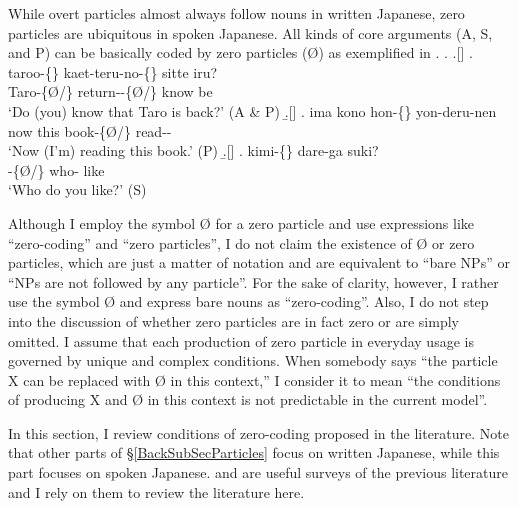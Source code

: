 While overt particles almost always follow nouns in written Japanese,
zero particles are ubiquitous in spoken Japanese.
All kinds of core arguments (A, S, and P) can be basically coded by zero particles ({\O}) as exemplified in \Next.
%
\ex. \a.[] 
	\bg. {taroo-\{\}} {kaet-teru-no-\{\}} sitte iru? \\
		Taro-\{{\O}/\} return--\{{\O}/\} know be \\
		`Do (you) know that Taro is back?' \hfill{(A \& P)}
	\b.[] 
	\bg. ima kono {hon-\{\}} yon-deru-nen \\
		now this book-\{{\O}/\} read-- \\
		`Now (I'm) reading this book.' \hfill{(P)}
	\b.[] 
	\bg. {kimi-\{\}} dare-ga suki? \\
		-\{{\O}/\} who- like \\
		`Who do you like?' \hfill{(S)}
		\begin{flushright}
		{\cite[pp.\ 367-368, glosses modified]{shibatani90}}
		\end{flushright}

Although I employ the symbol {\O} for a zero particle and
use expressions like ``zero-coding'' and ``zero particles'',
I do not claim the existence of {\O} or zero particles,
which are just a matter of notation and
are equivalent to ``bare NPs'' or ``NPs are not followed by any particle''.
For the sake of clarity, however,
I rather use the symbol {\O} and express bare nouns as ``zero-coding''.
Also, I do not step into the discussion of whether
zero particles are in fact zero or are simply omitted.
I assume that each production of zero particle in everyday usage is governed by unique and complex conditions.
When somebody says ``the particle X can be replaced with {\O} in this context,''
I consider it to mean ``the conditions of producing X and {\O} in this context is not predictable in the current model''.

In this section, I review conditions of zero-coding proposed in the literature.
Note that other parts of \S \ref{BackSubSecParticles}
focus on written Japanese,
while this part focuses on spoken Japanese.
 and  are useful surveys of the previous literature and
I rely on them to review the literature here.

